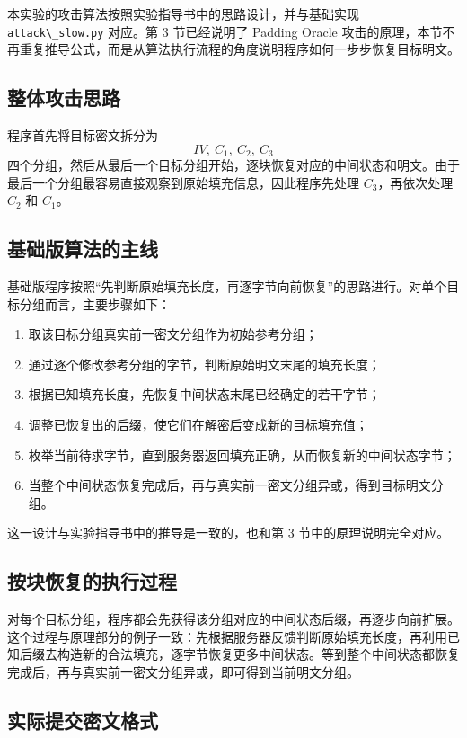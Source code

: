 本实验的攻击算法按照实验指导书中的思路设计，并与基础实现 \verb|attack\_slow.py| 对应。第 3 节已经说明了 Padding Oracle 攻击的原理，本节不再重复推导公式，而是从算法执行流程的角度说明程序如何一步步恢复目标明文。

\subsection{整体攻击思路}

程序首先将目标密文拆分为
\[
    IV,\ C_1,\ C_2,\ C_3
\]
四个分组，然后从最后一个目标分组开始，逐块恢复对应的中间状态和明文。由于最后一个分组最容易直接观察到原始填充信息，因此程序先处理 $C_3$，再依次处理 $C_2$ 和 $C_1$。

\subsection{基础版算法的主线}

基础版程序按照“先判断原始填充长度，再逐字节向前恢复”的思路进行。对单个目标分组而言，主要步骤如下：

\begin{enumerate}
    \item 取该目标分组真实前一密文分组作为初始参考分组；
    \item 通过逐个修改参考分组的字节，判断原始明文末尾的填充长度；
    \item 根据已知填充长度，先恢复中间状态末尾已经确定的若干字节；
    \item 调整已恢复出的后缀，使它们在解密后变成新的目标填充值；
    \item 枚举当前待求字节，直到服务器返回填充正确，从而恢复新的中间状态字节；
    \item 当整个中间状态恢复完成后，再与真实前一密文分组异或，得到目标明文分组。
\end{enumerate}

这一设计与实验指导书中的推导是一致的，也和第 3 节中的原理说明完全对应。

\subsection{按块恢复的执行过程}

对每个目标分组，程序都会先获得该分组对应的中间状态后缀，再逐步向前扩展。这个过程与原理部分的例子一致：先根据服务器反馈判断原始填充长度，再利用已知后缀去构造新的合法填充，逐字节恢复更多中间状态。等到整个中间状态都恢复完成后，再与真实前一密文分组异或，即可得到当前明文分组。

\subsection{实际提交密文格式}

